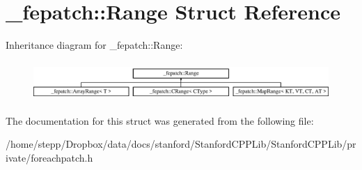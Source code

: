 \hypertarget{struct__fepatch_1_1Range}{}\section{\+\_\+fepatch\+:\+:Range Struct Reference}
\label{struct__fepatch_1_1Range}
Inheritance diagram for \+\_\+fepatch\+:\+:Range\+:\begin{figure}[H]
\begin{center}
\leavevmode
\includegraphics[height=1.493333cm]{struct__fepatch_1_1Range}
\end{center}
\end{figure}


The documentation for this struct was generated from the following file\+:\begin{DoxyCompactItemize}
\item 
/home/stepp/\+Dropbox/data/docs/stanford/\+Stanford\+C\+P\+P\+Lib/\+Stanford\+C\+P\+P\+Lib/private/foreachpatch.\+h\end{DoxyCompactItemize}
